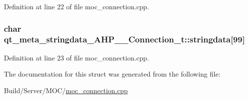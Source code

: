 Definition at line 22 of file moc\+\_\+connection.\+cpp.

\hypertarget{structqt__meta__stringdata___a_h_p_____connection__t_aca33441312edec146410217c76446058}{}
\subsubsection[{stringdata}]{\setlength{\rightskip}{0pt plus 5cm}char qt\+\_\+meta\+\_\+stringdata\+\_\+\+A\+H\+P\+\_\+\+\_\+\+Connection\+\_\+t\+::stringdata\mbox{[}99\mbox{]}}\label{structqt__meta__stringdata___a_h_p_____connection__t_aca33441312edec146410217c76446058}


Definition at line 23 of file moc\+\_\+connection.\+cpp.



The documentation for this struct was generated from the following file\+:\begin{DoxyCompactItemize}
\item 
Build/\+Server/\+M\+O\+C/\hyperlink{moc__connection_8cpp}{moc\+\_\+connection.\+cpp}\end{DoxyCompactItemize}
